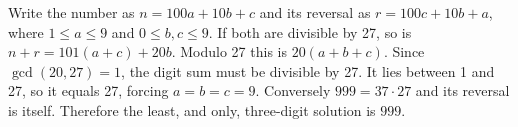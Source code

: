 Write the number as $n=100a+10b+c$ and its reversal as $r=100c+10b+a$, where $1\le a\le9$ and $0\le b,c\le9$. If both are divisible by 27, so is $n+r=101(a+c)+20b$. Modulo 27 this is $20(a+b+c)$. Since $\gcd(20,27)=1$, the digit sum must be divisible by 27. It lies between 1 and 27, so it equals 27, forcing $a=b=c=9$. Conversely $999=37\cdot27$ and its reversal is itself. Therefore the least, and only, three-digit solution is $\boxed{999}$.
